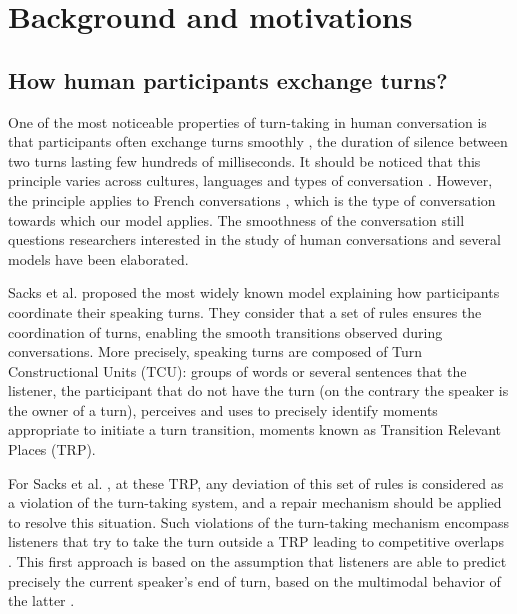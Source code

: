 
\section{Background and motivations}
\label{backgd}

\subsection{How human participants exchange turns?}
\label{social_psychology}

One of the most noticeable properties of turn-taking in human conversation is that participants often exchange turns
smoothly \citep{heldner_pauses_2010}, the duration of silence between two turns lasting few hundreds of milliseconds. 
It should be noticed that this principle
varies across cultures, languages and types of conversation \citep{oconnell_turntaking_2008,stivers_universals_2009}.
However, the principle applies to French conversations \citep{mondada_multimodal_2007}, 
which is the type of conversation towards which our model applies.
The smoothness of the conversation still questions researchers interested in the study of human conversations 
and several models have been elaborated. %
 
Sacks et al. \citep{sacks_simplest_1974} proposed the most widely known model explaining how participants coordinate their speaking turns.
They consider that a set of rules ensures the coordination of turns, enabling the smooth transitions observed during conversations.
More precisely, speaking turns are composed of Turn Constructional Units (TCU): groups of words or several sentences that the listener, the participant that do not have the turn (on the contrary the speaker is the owner of a turn), perceives and uses to precisely identify moments appropriate to initiate a turn transition, moments known as Transition Relevant Places (TRP).

For Sacks et al. \citep{sacks_simplest_1974}, at these TRP, any deviation of this set of rules is considered
as a violation of the turn-taking system, and a repair mechanism should be applied to resolve this situation.
Such violations of the turn-taking mechanism encompass listeners that try to take the turn outside a
TRP leading to competitive overlaps \citep{schegloff_overlapping_2000}.
This first approach is based on the assumption that
listeners are able to predict precisely the current speaker's end of turn, based on the multimodal behavior
of the latter \citep{de_ruiter_projecting_2006,french_turn-competitive_1983,ford_interactional_1996,mondada_multimodal_2007}. 

